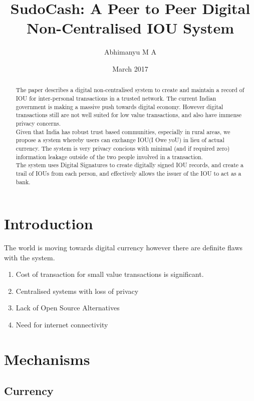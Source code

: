 \documentclass[12pt,a4paper]{article}
\begin{document}
\title{SudoCash: A Peer to Peer Digital Non-Centralised IOU System}
\author{Abhimanyu M A}
\date{March 2017}
\maketitle  

\begin{abstract}
The paper describes a digital non-centralised system to create and maintain a record of IOU for inter-personal transactions in a trusted network. The current Indian government is making a massive push towards digital economy. However digital transactions still are not well suited for low value transactions, and also have immense privacy concerns.\\
Given that India has robust trust based communities, especially in rural areas, we propose a system whereby users can exchange IOU(I Owe yoU) in lieu of actual currency. The system is very privacy concious with minimal (and if required zero) information leakage outside of the two people involved in a transaction.  \\
The system uses Digital Signatures to create digitally signed IOU records, and create a trail of IOUs from each person, and effectively allows the issuer of the IOU to act as a bank.
\end{abstract}

\section{Introduction}

The world is moving towards digital currency however there are definite flaws with the system.

\begin{enumerate}
\item Cost of transaction for small value transactions is significant.
\item Centralised systems with loss of privacy
\item Lack of Open Source Alternatives
\item Need for internet connectivity
\end{enumerate}


\section{Mechanisms}

\subsection{Currency}
\end{document}
